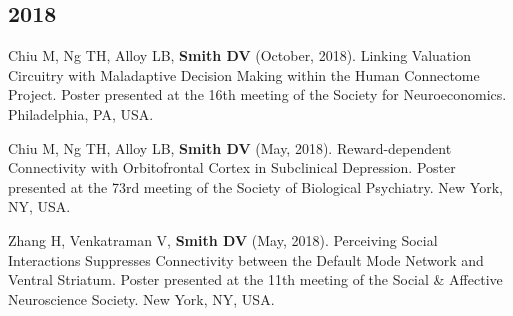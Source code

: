 \documentclass[11pt, letterpaper]{article}
\begin{document}
\subsection*{2018}
\begin{hangparas}{.5in}{1}

Chiu M, Ng TH, Alloy LB, \textbf{Smith DV} (October, 2018). Linking Valuation Circuitry with Maladaptive Decision Making within the Human Connectome Project. Poster presented at the 16th meeting of the Society for Neuroeconomics. Philadelphia, PA, USA.

Chiu M, Ng TH, Alloy LB, \textbf{Smith DV} (May, 2018). Reward-dependent Connectivity with Orbitofrontal Cortex in Subclinical Depression. Poster presented at the 73rd meeting of the Society of Biological Psychiatry. New York, NY, USA.

Zhang H, Venkatraman V, \textbf{Smith DV} (May, 2018). Perceiving Social Interactions Suppresses Connectivity between the Default Mode Network and Ventral Striatum. Poster presented at the 11th meeting of the Social \& Affective Neuroscience Society. New York, NY, USA. \\

\end{hangparas}
\end{document}
